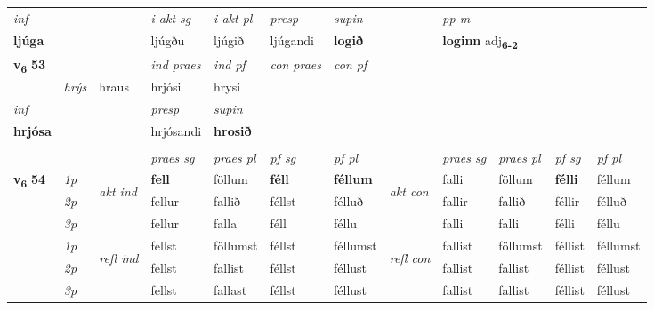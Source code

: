 \begin{longtable}[l]{X>{\footnotesize\itshape}llXXXXlXXXX}
   {\textit{inf}} & &  & \textit{i akt sg} & \textit{i akt pl}   & \textit{presp} & \textit{supin}  && \textit{pp m} \\*
  {\textbf{ljúga}} & && ljúgðu  & ljúgið   & ljúgandi &  \textbf{logið}  && \multicolumn{2}{l}{\textbf{loginn} adj\textbf{\textsubscript{6-2}}} \\*

\midrule

\multirow{2}{*}{{{\textbf{v{\textsubscript{6}}} \Large{\textbf{53}}}}}  &&&  \textit{ind praes} & \textit{ind pf} & \textit{con praes} & \textit{con pf} \\*
\multicolumn{3}{r}{\textit{e-m}} & hrýs & hraus & hrjósi & hrysi \\*

\cmidrule{4-7}
   {\textit{inf}} & &     & \textit{presp} & \textit{supin}   \\*
  {\textbf{hrjósa}} & &     & hrjósandi &  \textbf{hrosið}   \\*

\midrule
  & \\
   \midrule
 & &   & \textit{praes sg}  & \textit{praes pl}    & \textit{ pf sg} & \textit{pf pl} & & \textit{praes sg}  & \textit{praes pl}    & \textit{pf sg} & \textit{pf pl }  \\ \cmidrule{4-7} \cmidrule{9-12}
 \multirow{2}{*}{{{\textbf{v{\textsubscript{6}}} \Large{\textbf{54}}}}}  & 1p & \multirow{3}{*}{\begin{turn}{90}\textit{akt ind}\end{turn}} & \textbf{fell} & föllum & \textbf{féll} & \textbf{féllum} & \multirow{3}{*}{\begin{turn}{90}\textit{akt con}\end{turn}} &falli & föllum & \textbf{félli} & féllum\\*
 & 2p &  &  fellur  & fallið & féllst & félluð & & fallir & fallið & féllir & félluð \\*
 & 3p &  & fellur & falla & féll & féllu & & falli & falli& félli & féllu \\*
\cmidrule{4-7} \cmidrule{9-12}
 & 1p & \multirow{3}{*}{\begin{turn}{90}\textit{refl ind}\end{turn}}  & fellst & föllumst & féllst & féllumst & \multirow{3}{*}{\begin{turn}{90}\textit{refl con}\end{turn}}  &fallist & föllumst & féllist & féllumst \\*
 & 2p &  & fellst & fallist & féllst & féllust & &fallist & fallist & féllist & féllust \\*
 & 3p  & & fellst & fallast & féllst & féllust & & fallist & fallist& féllist & féllust \\*
\cmidrule{4-7} \cmidrule{9-12}


\end{longtable}
